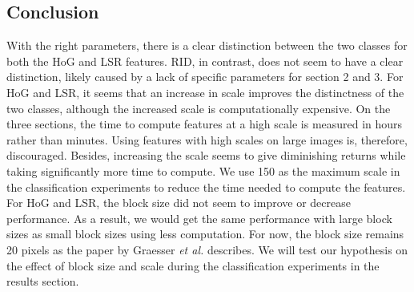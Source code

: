 \subsection{Conclusion}

With the right parameters, there is a clear distinction between the two classes for both the HoG and LSR features. RID, in contrast, does not seem to have a clear distinction, likely caused by a lack of specific parameters for section 2 and 3. For HoG and LSR, it seems that an increase in scale improves the distinctness of the two classes, although the increased scale is computationally expensive. On the three sections, the time to compute features at a high scale is measured in hours rather than minutes. Using features with high scales on large images is, therefore, discouraged. Besides, increasing the scale seems to give diminishing returns while taking significantly more time to compute. We use 150 as the maximum scale in the classification experiments to reduce the time needed to compute the features.
For HoG and LSR, the block size did not seem to improve or decrease performance. As a result, we would get the same performance with large block sizes as small block sizes using less computation. For now, the block size remains 20 pixels as the paper by Graesser \textit{et al.} describes. We will test our hypothesis on the effect of block size and scale during the classification experiments in the results section.


